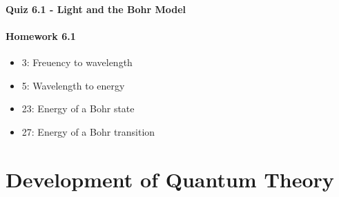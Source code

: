\documentclass[12pt, openany, letterpaper]{memoir}
\begin{document}
\paragraph*{Quiz 6.1 - Light and the Bohr Model}
\paragraph*{Homework 6.1}
\begin{itemize}
  \item 3: Freuency to wavelength
  \item 5: Wavelength to energy
  \item 23: Energy of a Bohr state
  \item 27: Energy of a Bohr transition
\end{itemize}

\section{Development of Quantum Theory}
\end{document}
